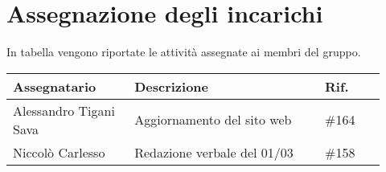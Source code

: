 \newpage
\section{Assegnazione degli incarichi}
In tabella vengono riportate le attività assegnate ai membri del gruppo.
\begin{center}
	{
		\renewcommand{\arraystretch}{1.5}
		\begin{tabular}{p{0.30\linewidth}|p{0.47\linewidth}|p{0.15\linewidth}}
			\textbf{Assegnatario}  & \textbf{Descrizione}        & \textbf{Rif.} \\
			\hline
			Alessandro Tigani Sava & Aggiornamento del sito web  & \#164         \\
			\hline
			Niccolò Carlesso       & Redazione verbale del 01/03 & \#158         \\
			\hline
		\end{tabular}
	}
\end{center}

